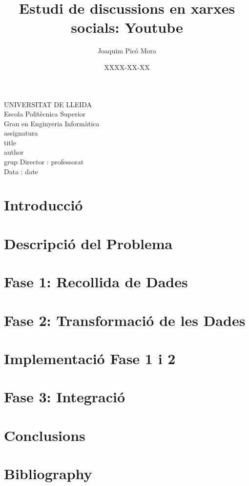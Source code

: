 \documentclass{article}
\title{Estudi de discussions en xarxes socials: Youtube}
\author{Joaquim Picó Mora}
\date{XXXX-XX-XX}
\renewcommand{\maketitle}{ %
	\begin{titlepage}
		\raggedright{UNIVERSITAT DE LLEIDA \\
			Escola Politècnica Superior \\
			Grau en Enginyeria Informàtica\\
			\1assignatura\\}
		\vspace{5cm}
		\centering\huge{\5title \\}
		\vspace{3cm}
		\large{\6author} \\
		\normalsize{\3grup}
		\vfill
		Director : \4professorat \\
		Data : \7date
\end{titlepage}}
\begin{document}
	\maketitle
	\thispagestyle{empty}
	\newpage
	\tableofcontents
	\newpage
	\section{Introducció}
	
	\newpage
	\section{Descripció del Problema}
	
	\newpage
	\section{Fase 1: Recollida de Dades}
	
	\section{Fase 2: Transformació de les Dades}
	
	\section{Implementació Fase 1 i 2}
	
	\section{Fase 3: Integració}
	
	\section{Conclusions}
	
	\section{Bibliography}
	
	
\end{document}
